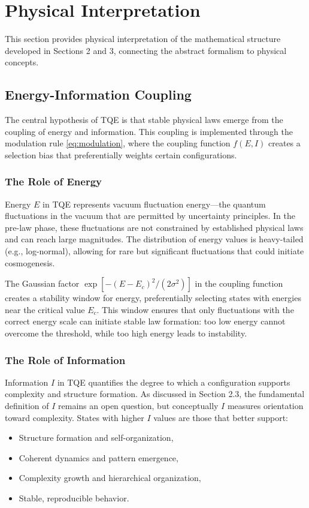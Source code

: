 \documentclass[12pt,a4paper]{article}
\theoremstyle{definition}
\theoremstyle{remark}
\begin{document}
\section{Physical Interpretation}

This section provides physical interpretation of the mathematical structure developed in Sections 2 and 3, connecting the abstract formalism to physical concepts.

\subsection{Energy-Information Coupling}

The central hypothesis of TQE is that stable physical laws emerge from the coupling of energy and information. This coupling is implemented through the modulation rule \eqref{eq:modulation}, where the coupling function $f(E,I)$ creates a selection bias that preferentially weights certain configurations.

\subsubsection{The Role of Energy}

Energy $E$ in TQE represents vacuum fluctuation energy—the quantum fluctuations in the vacuum that are permitted by uncertainty principles. In the pre-law phase, these fluctuations are not constrained by established physical laws and can reach large magnitudes. The distribution of energy values is heavy-tailed (e.g., log-normal), allowing for rare but significant fluctuations that could initiate cosmogenesis.

The Gaussian factor $\exp[-(E - E_c)^2/(2\sigma^2)]$ in the coupling function creates a stability window for energy, preferentially selecting states with energies near the critical value $E_c$. This window ensures that only fluctuations with the correct energy scale can initiate stable law formation: too low energy cannot overcome the threshold, while too high energy leads to instability.

\subsubsection{The Role of Information}

Information $I$ in TQE quantifies the degree to which a configuration supports complexity and structure formation. As discussed in Section 2.3, the fundamental definition of $I$ remains an open question, but conceptually $I$ measures orientation toward complexity. States with higher $I$ values are those that better support:
\begin{itemize}
\item Structure formation and self-organization,
\item Coherent dynamics and pattern emergence,
\item Complexity growth and hierarchical organization,
\item Stable, reproducible behavior.
\end{itemize}
\end{document}
